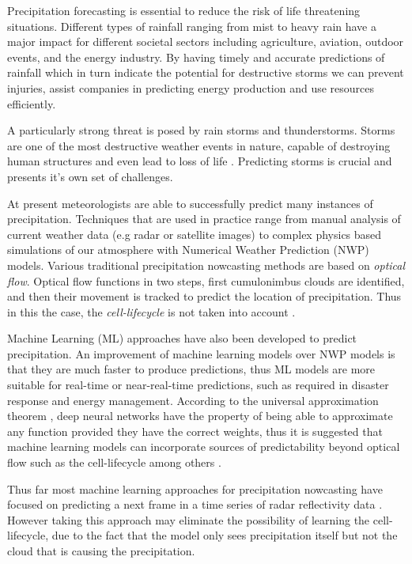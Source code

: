 Precipitation forecasting is essential to reduce the risk of life threatening situations. Different types of rainfall ranging from mist to heavy rain have a major impact for different societal sectors including agriculture, aviation, outdoor events, and the energy industry.
By having timely and accurate predictions of rainfall which in turn indicate the potential for destructive storms we can prevent injuries, assist companies in predicting energy production and use resources efficiently.
\medskip

A particularly strong threat is posed by rain storms and thunderstorms. Storms are one of the most destructive weather events in nature, capable of destroying human structures and even lead to loss of life \cite{noaa-national-severe-storms-laboratory-no-date}. Predicting storms is crucial and presents it's own set of challenges.
\medskip

At present meteorologists are able to successfully predict many instances of precipitation. Techniques that are used in practice range from manual analysis of current weather data (e.g radar or satellite images) to complex physics based simulations of our atmosphere with Numerical Weather Prediction (\textsc{NWP}) models.
Various traditional precipitation nowcasting methods are based on \textit{optical flow}. Optical flow functions in two steps, first cumulonimbus clouds are identified, and then their movement is tracked to predict the location of precipitation. Thus in this the case, the \textit{cell-lifecycle} \cite{noaas-national-weather-service-no-date} is not taken into account \cite{prudden2020review}.
\medskip

Machine Learning (\textsc{ML}) approaches have also been developed to predict precipitation. An improvement of machine learning models over \textsc{NWP} models is that they are much faster to produce predictions, thus ML models are more suitable for real-time or near-real-time predictions, such as required in disaster response and energy management. According to the universal approximation theorem \cite{cybenko-1989}, deep neural networks have the property of being able to approximate any function provided they have the correct weights, thus it is suggested that machine learning models can incorporate sources of predictability beyond optical flow such as the cell-lifecycle among others \cite{prudden2020review}.
\medskip

Thus far most machine learning approaches for precipitation nowcasting have focused on predicting a next frame in a time series of radar reflectivity data \cite{shi2017deep, convlstm, rainet}. However taking this approach may eliminate the possibility of learning the cell-lifecycle, due to the fact that the model only sees precipitation itself but not the cloud that is causing the precipitation.
\medskip


